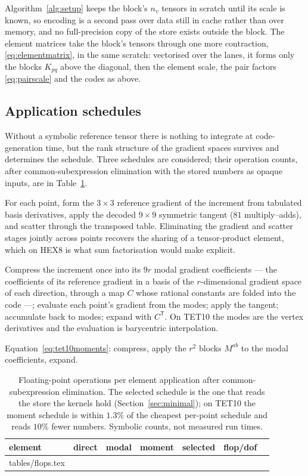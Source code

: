 \documentclass[sigconf,balance=false]{acmart}
\makeatletter
\newcommand{\rows}[1]{\@@input #1 }
\newcommand{\Mab}{M^{ab}}
\makeatother
\begin{document}
Algorithm~\ref{alg:setup} keeps the block's $n_v$ tensors in scratch until its scale is known, so
encoding is a second pass over data still in cache rather than over memory, and no full-precision
copy of the store exists outside the block.  The element matrices take the block's tensors through one
more contraction, \eqref{eq:elementmatrix}, in the same scratch: vectorised over the lanes, it forms only
the blocks $K_{pq}$ above the diagonal, then the element scale, the pair factors \eqref{eq:pairscale}
and the codes as above.

\subsection{Application schedules}
\label{sec:schedules}

Without a symbolic reference tensor there is nothing to integrate at code-generation time, but
the rank structure of the gradient spaces survives and determines the schedule.  Three schedules
are considered; their operation counts, after common-subexpression elimination with the stored
numbers as opaque inputs, are in Table~\ref{tab:flops}.

\begin{description}[leftmargin=1.5em]
\item[Direct, per point.]  For each point, form the $3\times3$ reference gradient of the increment
  from tabulated basis derivatives, apply the decoded $9\times9$ symmetric tangent ($81$
  multiply--adds), and scatter through the transposed table.  Eliminating the gradient and
  scatter stages jointly across points recovers the sharing of a tensor-product element, which on
  HEX8 is what sum factorisation would make explicit.
\item[Modal, per point.]  Compress the increment once into its $9r$ modal gradient coefficients
  --- the coefficients of its reference gradient in a basis of the $r$-dimensional gradient space
  of each direction, through a map $C$ whose rational constants are folded into the code ---;
  evaluate each point's gradient from the modes; apply the tangent; accumulate back to modes;
  expand with $C^{\mathsf T}$.  On TET10 the
  modes are the vertex derivatives and the evaluation is barycentric interpolation.
\item[Moment.]  Equation~\eqref{eq:tet10moments}: compress, apply the $r^2$ blocks $\Mab$ to the
  modal coefficients, expand.
\end{description}

\begin{table}[t]
\centering
\begin{tabular}{lrrrrrr}
\toprule
element & direct & modal & moment & selected & flop/dof \\
\midrule
\rows{tables/flops.tex}
\bottomrule
\end{tabular}
\caption{Floating-point operations per element application after common-subexpression
elimination.  The selected schedule is the one that reads the store the kernels hold
(Section~\ref{sec:minimal}); on TET10 the moment schedule is within $1.3\%$ of the cheapest per-point
schedule and reads $10\%$ fewer numbers.  Symbolic counts, not measured run times.}
\label{tab:flops}
\end{table}
\end{document}
